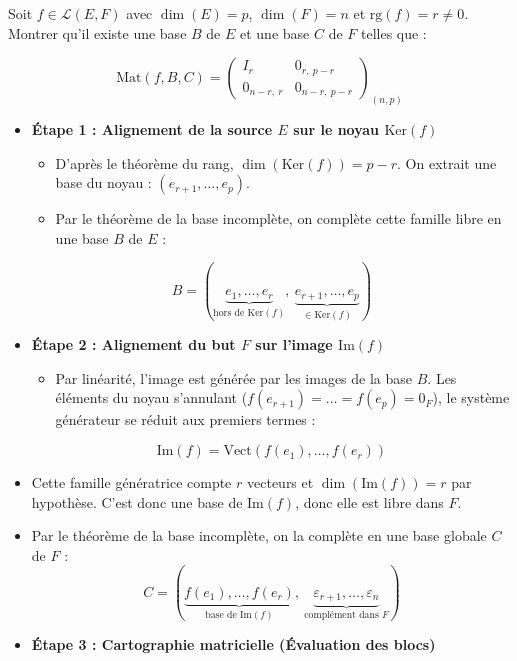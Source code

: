 \documentclass[11pt, a4paper]{article}
\theoremstyle{definition}
\begin{document}
\clearpage

\begin{tcolorbox}[instructionstyle]

Soit $f \in \mathcal{L}(E,F)$ avec $\dim(E)=p$, $\dim(F)=n$ et $\text{rg}(f)=r \neq 0$. Montrer qu'il existe une base $B$ de $E$ et une base $C$ de $F$ telles que :

\[
\text{Mat}(f,B,C) = \begin{pmatrix} I_r & 0_{r, \ p-r} \\ 0_{n-r, \ r} & 0_{n-r, \ p-r} \end{pmatrix}_{(n,p)}
\]
\end{tcolorbox}

\begin{itemize}
\item \textbf{Étape 1 : Alignement de la source $E$ sur le noyau $\text{Ker}(f)$}
\begin{itemize}
\item D'après le théorème du rang, $\dim(\text{Ker}(f)) = p - r$. On extrait une base du noyau : $(e_{r+1}, \dots, e_p)$.
\item Par le théorème de la base incomplète, on complète cette famille libre en une base $B$ de $E$ :
\end{itemize}
\[
B = (\underbrace{e_1, \dots, e_r}_{\text{hors de } \text{Ker}(f)}, \ \underbrace{e_{r+1}, \dots, e_p}_{\in \text{Ker}(f)})
\]
\item \textbf{Étape 2 : Alignement du but $F$ sur l'image $\text{Im}(f)$}
\begin{itemize}
\item Par linéarité, l'image est générée par les images de la base $B$. Les éléments du noyau s'annulant ($f(e_{r+1}) = \dots = f(e_p) = 0_F$), le système générateur se réduit aux premiers termes :
\end{itemize}
\[
\text{Im}(f) = \text{Vect}\left(f(e_1), \dots, f(e_r)\right)
\]
\item Cette famille génératrice compte $r$ vecteurs et $\dim(\text{Im}(f)) = r$ par hypothèse. C'est donc une base de $\text{Im}(f)$, donc elle est libre dans $F$.
\item Par le théorème de la base incomplète, on la complète en une base globale $C$ de $F$ :
\[
C = (\underbrace{f(e_1), \dots, f(e_r)}_{\text{base de } \text{Im}(f)}, \ \underbrace{\varepsilon_{r+1}, \dots, \varepsilon_n}_{\text{complément dans } F})
\]
\item \textbf{Étape 3 : Cartographie matricielle (Évaluation des blocs)}
\begin{itemize}

\end{itemize}
\end{itemize}
\end{document}
